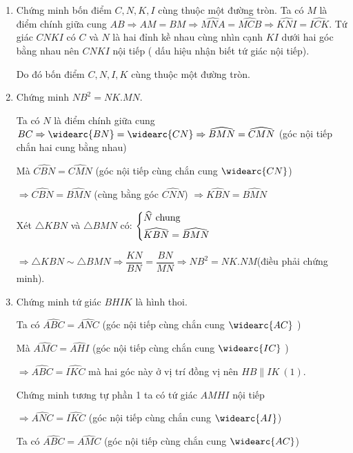 \begin{ex}
{    {\begin{enumerate}
    		\item Chứng minh bốn điểm $C,N,K,I$ cùng thuộc một đường tròn.
    		Ta có $M$ là điểm chính giữa cung $AB \Rightarrow AM=BM \Rightarrow \widehat{MNA}=\widehat{MCB} \Rightarrow \widehat{KNI}=\widehat{ICK}$. Tứ giác $CNKI$ có $C$ và $N$ là hai đỉnh kề nhau cùng nhìn cạnh $KI$ dưới hai góc bằng nhau nên $CNKI$ nội tiếp ( dấu hiệu nhận biết tứ giác nội tiếp).
    		
    		Do đó bốn điểm $C,N,I,K$ cùng thuộc một đường tròn.
    		
    		\item Chứng minh $NB^2=NK.MN$.
    		
    		Ta có $N$ là điểm chính giữa cung $BC \Rightarrow \widearc{BN}=\widearc{CN} \Rightarrow  \widehat{BMN}=\widehat{CMN}$ (góc nội tiếp chắn hai cung bằng nhau)
    		
    		Mà $\widehat{CBN}=\widehat{CMN}$ (góc nội tiếp cùng chắn cung $\widearc{CN}$)
    		
    		$\Rightarrow \widehat{CBN}=\widehat{BMN}$ (cùng bằng góc $\widehat{CNN}$) $\Rightarrow \widehat{KBN}=\widehat{BMN}$
    		
    		Xét $\bigtriangleup KBN$ và $\bigtriangleup BMN$ có: 
    		$\heva{& \widehat{N} \ \text{chung}\\& \widehat{KBN}=\widehat{BMN}}$
    		
    		$\Rightarrow  \bigtriangleup KBN \sim \bigtriangleup BMN  \Rightarrow \dfrac{KN}{BN}=\dfrac{BN}{MN} \Rightarrow NB^2=NK.NM	$(điều phải chứng minh).
    		
    		\item Chứng minh tứ giác $BHIK$ là hình thoi.
    		
    		Ta có $\widehat{ABC}=\widehat{ANC}$ (góc nội tiếp cùng chắn cung $\widearc{AC}$ )
    		
    		Mà $\widehat{AMC}=\widehat{AHI}$ (góc nội tiếp cùng chắn cung $\widearc{IC}$ )
    		
    		$\Rightarrow \widehat{ABC}=\widehat{IKC}	$ mà hai góc này ở vị trí đồng vị nên $HB \parallel IK  \ (1)$.
    		
    		   Chứng minh tương tự phần 1 ta có tứ giác $AMHI$ nội tiếp
    		   
    		   $ \Rightarrow \widehat{ANC}=\widehat{IKC}$ (góc nội tiếp cùng chắn cung $\widearc{AI}$)
    		   
    		   Ta có  $  \widehat{ABC}=\widehat{AMC}$ (góc nội tiếp cùng chắn cung $\widearc{AC}$)
    		   

\end{enumerate}}}
\end{ex}
